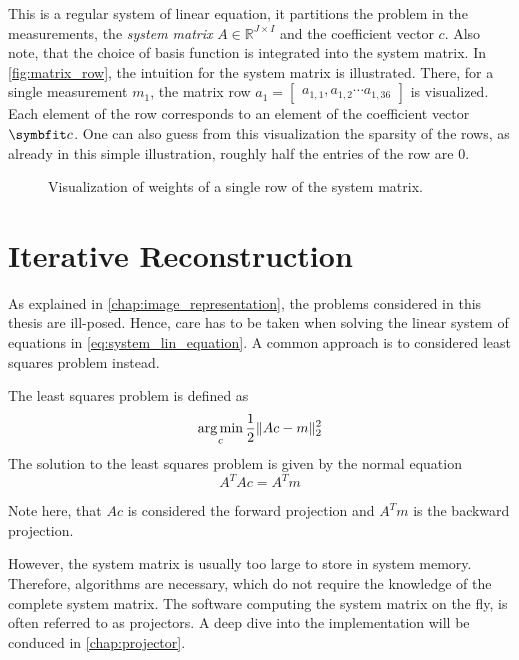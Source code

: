 This is a regular system of linear equation, it partitions the problem in the measurements, the
\textit{system matrix} \(A \in \mathbb{R}^{J \times I}\) and the coefficient vector \(c\). Also
note, that the choice of basis function is integrated into the system matrix. In
\autoref{fig:matrix_row}, the intuition for the system matrix is illustrated. There, for a single
measurement \(m_1\), the matrix row \(a_{1} = \begin{bmatrix}a_{1, 1}, a_{1, 2} \cdots
	a_{1,36}\end{bmatrix}\) is visualized. Each element of the row corresponds to an element of the
coefficient vector \(\mvec{c}\). One can also guess from this visualization the sparsity of the
rows, as already in this simple illustration, roughly half the entries of the row are \(0\).

\begin{figure}
	\centering
	
	\caption{Visualization of weights of a single row of the system matrix. }\label{fig:matrix_row}
\end{figure}

\section{Iterative Reconstruction}\label{sec:iterative_reconstruction}

As explained in \autoref{chap:image_representation}, the problems considered in this thesis are
ill-posed. Hence, care has to be taken when solving the linear system of equations in
\autoref{eq:system_lin_equation}. A common approach is to considered least squares problem instead.

\begin{definition}\label{def:least_squares_problem}
	The least squares problem is defined as
	\[ \operatorname*{arg\,min}_c \frac{1}{2} \lVert Ac - m\rVert^2_2 \]
	The solution to the least squares problem is given by the normal equation
	\[ A^T A c = A^T m \]
\end{definition}

Note here, that \(Ac\) is considered the forward projection and \(A^T m\) is the backward
projection.

However, the system matrix is usually too large to store in system memory. Therefore, algorithms are
necessary, which do not require the knowledge of the complete system matrix. The software computing
the system matrix on the fly, is often referred to as projectors. A deep dive into the
implementation will be conduced in \autoref{chap:projector}.

